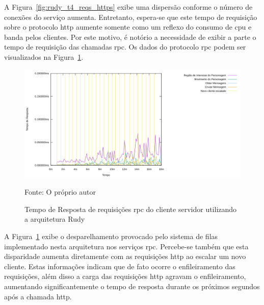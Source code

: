 A Figura~\ref{fig:rudy_t4_reqs_https} exibe uma dispersão conforme o número de conexões do serviço aumenta.
%
Entretanto, espera-se que este tempo de requisição sobre o protocolo \ac{http} aumente somente como um reflexo do consumo de \ac{cpu} e banda pelos clientes.
%
Por este motivo, é notório a necessidade de exibir a parte o tempo de requisição das chamadas \ac{rpc}.
%
Os dados do protocolo \ac{rpc} podem ser visualizados na Figura~\ref{fig:rudy_t4_reqs_rpc}.

\begin{figure}[htb!]
    \caption{Tempo de Resposta de requisições \ac{rpc} do cliente servidor utilizando a arquitetura Rudy}
    \label{fig:rudy_t4_reqs_rpc}
    \includegraphics[width=\textwidth]{metricas_rudy_t4/rudyc_rpc.png}
    \centering
    
    Fonte: O próprio autor
\end{figure}

A Figura~\ref{fig:rudy_t4_reqs_rpc} exibe o desparelhamento provocado pelo sistema de filas implementado nesta arquitetura nos serviços \ac{rpc}.
%
Percebe-se também que esta disparidade aumenta diretamente com as requisições \ac{http} ao escalar um novo cliente.
%
Estas informações indicam que de fato ocorre o enfileiramento das requisições, além disso a carga das requisições \ac{http} agravam o enfileiramento, aumentando significantemente o tempo de resposta durante os próximos segundos após a chamada \ac{http}.